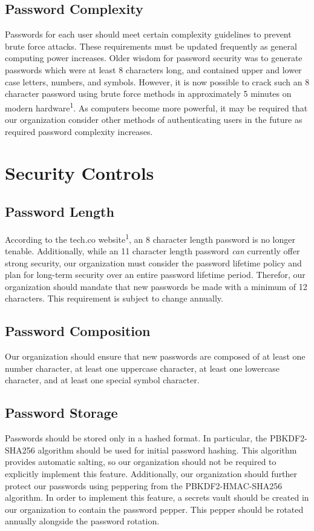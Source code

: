 \documentclass[11pt]{article}
\begin{document}
\subsection{Password Complexity}
\label{sec:org2a78e3c}
Passwords for each user should meet certain complexity guidelines to prevent brute force attacks. These requirements must be updated frequently as general computing power increases. Older wisdom for password security was to generate passwords which were at least 8 characters long, and contained upper and lower case letters, numbers, and symbols. However, it is now possible to crack such an 8 character password using brute force methods in approximately 5 minutes on modern hardware\textsuperscript{1}. As computers become more powerful, it may be required that our organization consider other methods of authenticating users in the future as required password complexity increases.

\section{Security Controls}
\label{sec:orge022b5b}
\subsection{Password Length}
\label{sec:org1d021f3}
According to the tech.co website\textsuperscript{1}, an 8 character length password is no longer tenable. Additionally, while an 11 character length password \emph{can} currently offer strong security, our organization must consider the password lifetime policy and plan for long-term security over an entire password lifetime period. Therefor, our organization should mandate that new passwords be made with a minimum of 12 characters. This requirement is subject to change annually.

\subsection{Password Composition}
\label{sec:orgbc4c16d}
Our organization should ensure that new passwords are composed of at least one number character, at least one uppercase character, at least one lowercase character, and at least one special symbol character.

\subsection{Password Storage}
\label{sec:org3520cae}
Passwords should be stored only in a hashed format. In particular, the PBKDF2-SHA256 algorithm should be used for initial password hashing. This algorithm provides automatic salting, so our organization should not be required to explicitly implement this feature. Additionally, our organization should further protect our passwords using peppering from the PBKDF2-HMAC-SHA256 algorithm. In order to implement this feature, a secrets vault should be created in our organization to contain the password pepper. This pepper should be rotated annually alongside the password rotation.
\end{document}
